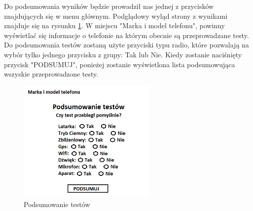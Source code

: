 Do podsumowania wyników będzie prowadził nas jednej z przycisków znajdujących się w menu głównym. Podglądowy wyląd strony z wynikami znajduje się na rysunku \ref{rys:wyniki_punkt2}. W miejscu "Marka i model telefonu", powinny wyświetlać się informacje o telefonie na którym obecnie są przeprowadzane testy. Do podsumowania testów zostaną użyte przyciski typu radio, które pozwalają na wybór tylko jednego przycisku z grupy: Tak lub Nie. Kiedy zostanie naciśnięty przycisk "PODSUMUJ", ponieżej zostanie wyświetlona lista podsumowująca wszyskie przeprowadzone testy.

\begin{figure}[!hbt]
	\begin{center}
		\includegraphics[angle=360, width=0.60\textwidth]{rys/punkt2/wyniki.png}
		\caption{Podsumowanie testów}
		\label{rys:wyniki_punkt2}
	\end{center}
\end{figure}






